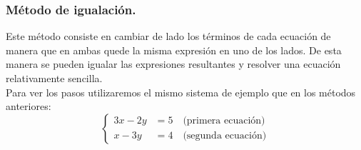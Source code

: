 \documentclass[a4paper,11pt,answers]{exam}
\begin{document}
   \subsubsection{Método de igualación.}
   Este método consiste en cambiar de lado los términos de cada ecuación de
   manera que en ambas quede la misma expresión en uno de los lados.
   De esta manera se pueden igualar las expresiones resultantes y
   resolver una ecuación relativamente sencilla.\\
   
   Para ver los pasos utilizaremos el mismo sistema de ejemplo que en los métodos anteriores:
   \[
     \begin{cases}
       3x-2y&=5 \quad \text{(primera ecuación)}\\
       x-3y &= 4 \quad \text{(segunda ecuación)}
     \end{cases}
   \]
\end{document}
